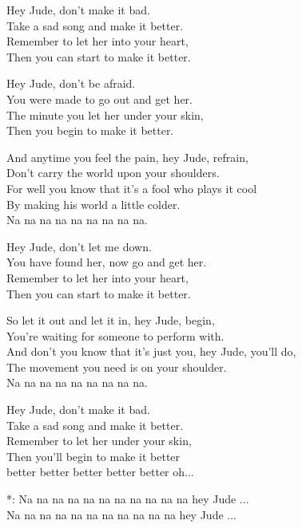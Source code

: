 \ve{}
Hey Jude, don't make it bad.\\
Take a sad song and make it better.\\
Remember to let her into your heart,\\
Then you can start to make it better.

\ve{}
Hey Jude, don't be afraid.\\
You were made to go out and get her.\\
The minute you let her under your skin,\\
Then you begin to make it better.


\cho{}
And anytime you feel the pain, hey Jude, refrain,\\
Don't carry the world upon your shoulders.\\
For well you know that it's a fool who plays it cool\\
By making his world a little colder.\\
Na na na na na na na na na.

\ve{}
Hey Jude, don't let me down.\\
You have found her, now go and get her.\\
Remember to let her into your heart,\\
Then you can start to make it better.

\cho{}
So let it out and let it in, hey Jude, begin,\\
You're waiting for someone to perform with.\\
And don't you know that it's just you, hey Jude, you'll do,\\
The movement you need is on your shoulder.\\
Na na na na na na na na na.

\ve{}
Hey Jude, don't make it bad.\\
Take a sad song and make it better.\\
Remember to let her under your skin,\\
Then you'll begin to make it better \\
better better better better better oh...
 
\re{}
*: Na na na na na na na na na na na hey Jude ...\\
Na na na na na na na na na na na hey Jude ...
\esong{}
